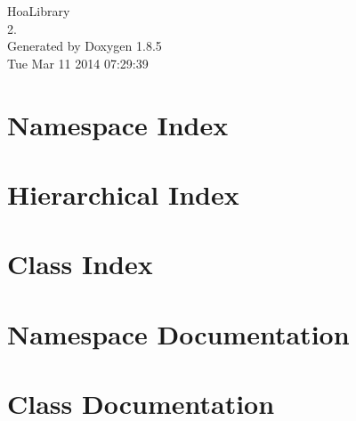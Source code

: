 \documentclass[twoside]{book}
\newcommand{\clearemptydoublepage}{%
  \newpage{\pagestyle{empty}\cleardoublepage}%
}
\begin{document}
\hypersetup{pageanchor=false}
\begin{titlepage}
\vspace*{7cm}
\begin{center}%
{\Large Hoa\-Library \\[1ex]\large 2. }\\
\vspace*{1cm}
{\large Generated by Doxygen 1.8.5}\\
\vspace*{0.5cm}
{\small Tue Mar 11 2014 07:29:39}\\
\end{center}
\end{titlepage}
\clearemptydoublepage
\tableofcontents
\clearemptydoublepage
{}
\hypersetup{pageanchor=true}

\chapter{Namespace Index}

\chapter{Hierarchical Index}

\chapter{Class Index}

\chapter{Namespace Documentation}



\chapter{Class Documentation}


































\newpage
{}
{}
\printindex
\end{document}
